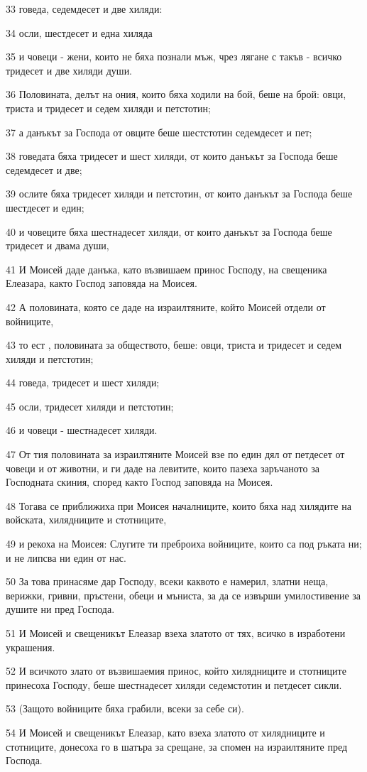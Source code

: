 \par 33 говеда, седемдесет и две хиляди:
\par 34 осли, шестдесет и една хиляда
\par 35 и човеци - жени, които не бяха познали мъж, чрез лягане с такъв - всичко тридесет и две хиляди души.
\par 36 Половината, делът на ония, които бяха ходили на бой, беше на брой: овци, триста и тридесет и седем хиляди и петстотин;
\par 37 а данъкът за Господа от овците беше шестстотин седемдесет и пет;
\par 38 говедата бяха тридесет и шест хиляди, от които данъкът за Господа беше седемдесет и две;
\par 39 ослите бяха тридесет хиляди и петстотин, от които данъкът за Господа беше шестдесет и един;
\par 40 и човеците бяха шестнадесет хиляди, от които данъкът за Господа беше тридесет и двама души,
\par 41 И Моисей даде данъка, като възвишаем принос Господу, на свещеника Елеазара, както Господ заповяда на Моисея.
\par 42 А половината, която се даде на израилтяните, който Моисей отдели от войниците,
\par 43 то ест , половината за обществото, беше: овци, триста и тридесет и седем хиляди и петстотин;
\par 44 говеда, тридесет и шест хиляди;
\par 45 осли, тридесет хиляди и петстотин;
\par 46 и човеци - шестнадесет хиляди.
\par 47 От тия половината за израилтяните Моисей взе по един дял от петдесет от човеци и от животни, и ги даде на левитите, които пазеха заръчаното за Господната скиния, според както Господ заповяда на Моисея.
\par 48 Тогава се приближиха при Моисея началниците, които бяха над хилядите на войската, хилядниците и стотниците,
\par 49 и рекоха на Моисея: Слугите ти преброиха войниците, които са под ръката ни; и не липсва ни един от нас.
\par 50 За това принасяме дар Господу, всеки каквото е намерил, златни неща, верижки, гривни, пръстени, обеци и мъниста, за да се извърши умилостивение за душите ни пред Господа.
\par 51 И Моисей и свещеникът Елеазар взеха златото от тях, всичко в изработени украшения.
\par 52 И всичкото злато от възвишаемия принос, който хилядниците и стотниците принесоха Господу, беше шестнадесет хиляди седемстотин и петдесет сикли.
\par 53 (Защото войниците бяха грабили, всеки за себе си).
\par 54 И Моисей и свещеникът Елеазар, като взеха златото от хилядниците и стотниците, донесоха го в шатъра за срещане, за спомен на израилтяните пред Господа.

